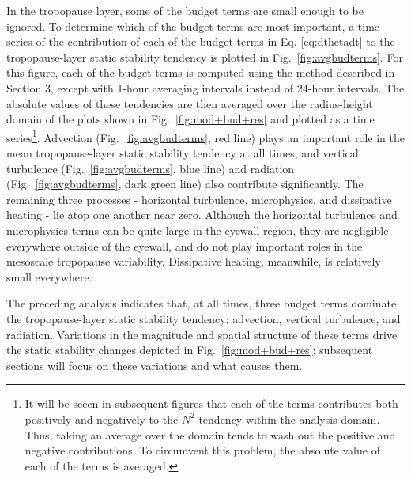 \documentclass{ametsoc}
\begin{document}
In the tropopause layer, some of the budget terms are small enough to be ignored.
To determine which of the budget terms are most important, a time series of the contribution of each of the budget terms in Eq. \ref{eq:dthetadt} to the tropopause-layer static stability tendency is plotted in Fig.~\ref{fig:avgbudterms}.
For this figure, each of the budget terms is computed using the method described in Section 3, except with 1-hour averaging intervals instead of 24-hour intervals.
The absolute values of these tendencies are then averaged over the radius-height domain of the plots shown in Fig.~\ref{fig:mod+bud+res} and plotted as a time series\footnote{It will be seeen in subsequent figures that each of the terms contributes both positively and negatively to the $N^2$ tendency within the analysis domain. 
Thus, taking an average over the domain tends to wash out the positive and negative contributions.
To circumvent this problem, the absolute value of each of the terms is averaged.}. 
Advection (Fig.~\ref{fig:avgbudterms}, red line) plays an important role in the mean tropopause-layer static stability tendency at all times, and vertical turbulence (Fig.~\ref{fig:avgbudterms}, blue line) and radiation (Fig.~\ref{fig:avgbudterms}, dark green line) also contribute significantly.
The remaining three processes - horizontal turbulence, microphysics, and dissipative heating - lie atop one another near zero.
Although the horizontal turbulence and microphysics terms can be quite large in the eyewall region, they are negligible everywhere outside of the eyewall, and do not play important roles in the mesoscale tropopause variability.
Dissipative heating, meanwhile, is relatively small everywhere.

The preceding analysis indicates that, at all times, three budget terms dominate the tropopause-layer static stability tendency: advection, vertical turbulence, and radiation.
Variations in the magnitude and spatial structure of these terms drive the static stability changes depicted in Fig.~\ref{fig:mod+bud+res}; subsequent sections will focus on these variations and what causes them.
\end{document}
